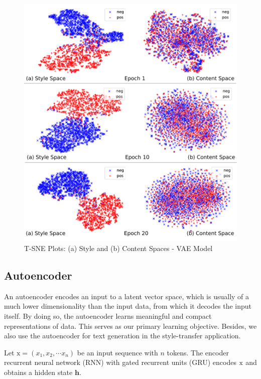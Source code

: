 \documentclass[11pt,a4paper]{article}
\newcommand{\rmx}{\mathrm x}
\begin{document}
\begin{figure}[ht]
	\captionsetup{justification=centering}
	\includegraphics[width=\linewidth]{latent-spaces-vae}
	\caption{T-SNE Plots: (a) Style and (b) Content Spaces - VAE Model}
	\label{fig:vae-tsne}
\end{figure}


\subsection{Autoencoder} \label{ssec:seq2seq-autoencoder}

An autoencoder encodes an input to a latent vector space, which is usually of a much lower dimensionality than the input data, from which it decodes the input itself. By doing so, the autoencoder learns meaningful and compact representations of data. This serves as our primary learning objective. Besides, we also use the autoencoder for text generation in the style-transfer application.

Let $\rmx=(x_1, x_2, \cdots x_n)$ be an input sequence with $n$ tokens. The encoder recurrent neural network (RNN) with gated recurrent units (GRU) \cite{cho2014learning} encodes $\rm x$ and obtains a hidden state $\bm h$.
\end{document}
